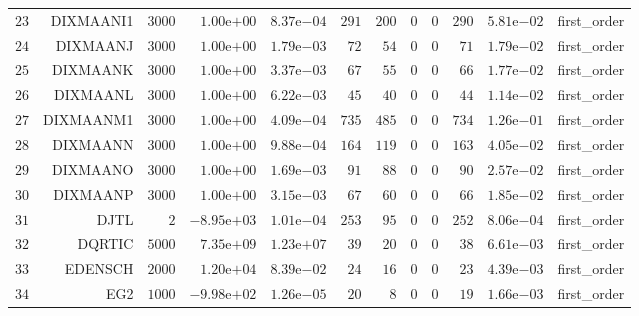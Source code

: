 \begin{longtable}{rrrrrrrrrrrr}
  \(    23\) & DIXMAANI1 & \(  3000\) & \( 1.00\)e\(+00\) & \( 8.37\)e\(-04\) & \(   291\) & \(   200\) & \(     0\) & \(     0\) & \(   290\) & \( 5.81\)e\(-02\) & first\_order \\
  \(    24\) & DIXMAANJ & \(  3000\) & \( 1.00\)e\(+00\) & \( 1.79\)e\(-03\) & \(    72\) & \(    54\) & \(     0\) & \(     0\) & \(    71\) & \( 1.79\)e\(-02\) & first\_order \\
  \(    25\) & DIXMAANK & \(  3000\) & \( 1.00\)e\(+00\) & \( 3.37\)e\(-03\) & \(    67\) & \(    55\) & \(     0\) & \(     0\) & \(    66\) & \( 1.77\)e\(-02\) & first\_order \\
  \(    26\) & DIXMAANL & \(  3000\) & \( 1.00\)e\(+00\) & \( 6.22\)e\(-03\) & \(    45\) & \(    40\) & \(     0\) & \(     0\) & \(    44\) & \( 1.14\)e\(-02\) & first\_order \\
  \(    27\) & DIXMAANM1 & \(  3000\) & \( 1.00\)e\(+00\) & \( 4.09\)e\(-04\) & \(   735\) & \(   485\) & \(     0\) & \(     0\) & \(   734\) & \( 1.26\)e\(-01\) & first\_order \\
  \(    28\) & DIXMAANN & \(  3000\) & \( 1.00\)e\(+00\) & \( 9.88\)e\(-04\) & \(   164\) & \(   119\) & \(     0\) & \(     0\) & \(   163\) & \( 4.05\)e\(-02\) & first\_order \\
  \(    29\) & DIXMAANO & \(  3000\) & \( 1.00\)e\(+00\) & \( 1.69\)e\(-03\) & \(    91\) & \(    88\) & \(     0\) & \(     0\) & \(    90\) & \( 2.57\)e\(-02\) & first\_order \\
  \(    30\) & DIXMAANP & \(  3000\) & \( 1.00\)e\(+00\) & \( 3.15\)e\(-03\) & \(    67\) & \(    60\) & \(     0\) & \(     0\) & \(    66\) & \( 1.85\)e\(-02\) & first\_order \\
  \(    31\) & DJTL & \(     2\) & \(-8.95\)e\(+03\) & \( 1.01\)e\(-04\) & \(   253\) & \(    95\) & \(     0\) & \(     0\) & \(   252\) & \( 8.06\)e\(-04\) & first\_order \\
  \(    32\) & DQRTIC & \(  5000\) & \( 7.35\)e\(+09\) & \( 1.23\)e\(+07\) & \(    39\) & \(    20\) & \(     0\) & \(     0\) & \(    38\) & \( 6.61\)e\(-03\) & first\_order \\
  \(    33\) & EDENSCH & \(  2000\) & \( 1.20\)e\(+04\) & \( 8.39\)e\(-02\) & \(    24\) & \(    16\) & \(     0\) & \(     0\) & \(    23\) & \( 4.39\)e\(-03\) & first\_order \\
  \(    34\) & EG2 & \(  1000\) & \(-9.98\)e\(+02\) & \( 1.26\)e\(-05\) & \(    20\) & \(     8\) & \(     0\) & \(     0\) & \(    19\) & \( 1.66\)e\(-03\) & first\_order \\

\end{longtable}
